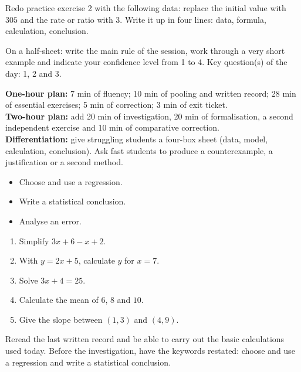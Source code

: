 
\begin{dm}Redo practice exercise 2 with the following data: replace the initial value with $305$ and the rate or ratio with $3$. Write it up in four lines: data, formula, calculation, conclusion.\end{dm}

\begin{sortie}On a half-sheet: write the main rule of the session, work through a very short example and indicate your confidence level from 1 to 4. Key question(s) of the day: 1, 2 and 3.\end{sortie}

\ifprof
\begin{methode}
\textbf{One-hour plan:} 7 min of fluency; 10 min of pooling and written record; 28 min of essential exercises; 5 min of correction; 3 min of exit ticket.\\
\textbf{Two-hour plan:} add 20 min of investigation, 20 min of formalisation, a second independent exercise and 10 min of comparative correction.\\
\textbf{Differentiation:} give struggling students a four-box sheet (data, model, calculation, conclusion). Ask fast students to produce a counterexample, a justification or a second method.
\end{methode}
\fi
{}
\begin{objectifs}\begin{itemize}\item Choose and use a regression.\item Write a statistical conclusion.\item Analyse an error.\end{itemize}\end{objectifs}
\begin{automatismes}\begin{enumerate}\item Simplify $3x+6-x+2$. \item With $y=2x+5$, calculate $y$ for $x=7$. \item Solve $3x+4=25$. \item Calculate the mean of $6$, $8$ and $10$. \item Give the slope between $(1,3)$ and $(4,9)$. \end{enumerate}\end{automatismes}
\begin{prerequis}Reread the last written record and be able to carry out the basic calculations used today. Before the investigation, have the keywords restated: choose and use a regression and write a statistical conclusion.\end{prerequis}

